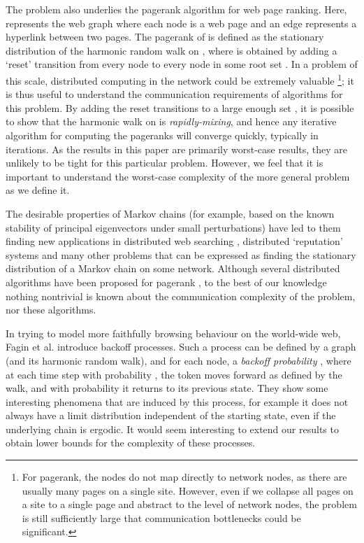 \documentclass[twocolumn]{article}
\begin{document}
The problem also underlies the pagerank algorithm \cite{page98pagerank} for web page ranking. Here,  represents the web graph where each node is a web page and an edge represents a hyperlink between two pages. The pagerank of  is defined as the stationary distribution of the harmonic random walk on , where  is obtained by adding a `reset' transition from every node to every node in some root set . In a problem of this scale, distributed computing in the network could be extremely valuable
\footnote{For pagerank, the nodes do not map directly to network 
nodes, as there are usually many pages on a single site. However, even 
if we collapse all pages on a site to a single page and abstract to the level
of network nodes, the problem is still sufficiently large that communication 
bottlenecks could be significant.}; it is thus useful to understand the communication requirements of algorithms for this problem. By adding the reset transitions to a large enough set , it is possible to show that the harmonic walk on  is {\em rapidly-mixing}, and hence any iterative algorithm for computing the pageranks will converge quickly, typically in  iterations. As the results in this paper are primarily worst-case results, they are unlikely to be tight for this particular problem. However, we feel that it is important to understand the worst-case complexity of the more general problem as we define it.

The desirable properties of Markov chains (for example, based on the known stability of principal eigenvectors under small perturbations) have led to them finding new applications in distributed web searching \cite{wang04vldb,hpdc03pagerank}, distributed `reputation' systems \cite{eigentrust} and many other problems that can be expressed as finding the stationary distribution of a Markov chain on some network. Although several distributed algorithms have been proposed for pagerank \cite{eigentrust,hpdc03pagerank,kamvar03exploiting,page98pagerank,wang04vldb,shi03icpp}, to the best of our knowledge nothing nontrivial is known about the communication complexity of the problem, nor these algorithms.

In trying to model more faithfully browsing behaviour on the world-wide web, Fagin et al. \cite{fagin00} introduce backoff processes. Such a process can be defined by a graph  (and its harmonic random walk), and for each node, a {\em backoff probability} , where at each time step with probability , the token moves forward as defined by the walk, and with probability  it returns to its previous state. They show some interesting phenomena that are induced by this process, for example it does not always have a limit distribution independent of the starting state, even if the underlying chain is ergodic. It would seem interesting to extend our results to obtain lower bounds for the complexity of these processes.
\end{document}
